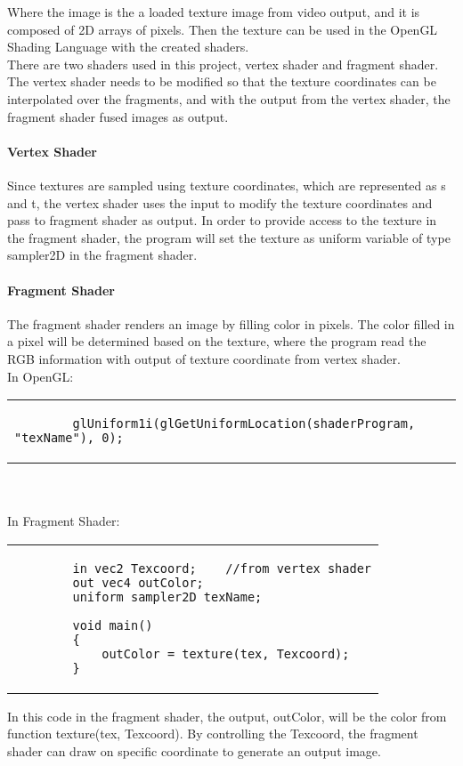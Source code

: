 Where the image is the a loaded texture image from video output, and it is composed of 
2D arrays of pixels. Then the texture can be used in the OpenGL Shading Language with 
the created shaders.\\

There are two shaders used in this project, vertex shader and fragment shader. The 
vertex shader needs to be modified so that the texture coordinates can be interpolated 
over the fragments, and with the output from the vertex shader, the fragment shader 
fused images as output. \\

\paragraph{Vertex Shader}

Since textures are sampled using texture coordinates, which are represented as s and 
t, the vertex shader uses the input to modify the texture coordinates and pass to 
fragment shader as output. In order to provide access to the texture in the fragment 
shader, the program will set the texture as uniform variable of type sampler2D in the 
fragment shader.\\

\paragraph{Fragment Shader}

The fragment shader renders an image by filling color in pixels. The color filled in a 
pixel will be determined based on the texture, where the program read the RGB 
information with output of texture coordinate from vertex shader.\\

In OpenGL:\\
\begin{tabular}{|p{15cm}|}
	\begin{lstlisting}
		glUniform1i(glGetUniformLocation(shaderProgram, "texName"), 0);
	\end{lstlisting}
\end{tabular}
\\
\\
In Fragment Shader:\\
\begin{tabular}{|p{15cm}|}
	\begin{lstlisting}
   		in vec2 Texcoord;    //from vertex shader
   		out vec4 outColor;
   		uniform sampler2D texName;

   		void main()
   		{
        	outColor = texture(tex, Texcoord);
   		}
	\end{lstlisting}
\end{tabular}

In this code in the fragment shader, the output, outColor, will be the color from 
function texture(tex, Texcoord). By controlling the Texcoord, the fragment shader 
can draw on specific coordinate to generate an output image.\\